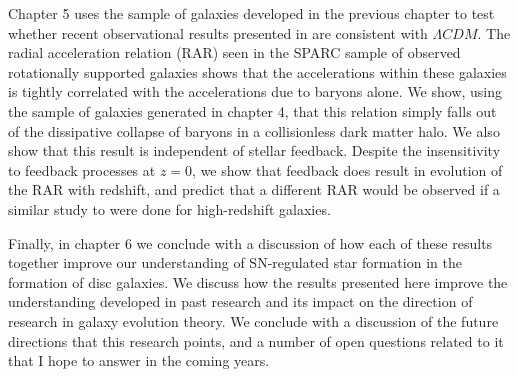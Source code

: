 Chapter 5 uses the sample of galaxies developed in the previous chapter to
test whether recent observational results presented in \citet{McGaugh2016}
are consistent with $\Lambda CDM$.  The radial acceleration relation (RAR) seen in
the SPARC sample \citep{Lelli2016} of observed rotationally supported galaxies
shows that the accelerations within these galaxies is tightly correlated 
with the accelerations due to baryons alone.  We show, using the sample of
galaxies generated in chapter 4, that this relation simply falls out of the
dissipative collapse of baryons in a collisionless dark matter halo.  We also
show that this result is independent of stellar feedback.  Despite the insensitivity
to feedback processes at $z=0$, we show that feedback does result in evolution
of the RAR with redshift, and predict that a different RAR would be observed if
a similar study to \citet{Lelli2016} were done for high-redshift galaxies.

Finally, in chapter 6 we conclude with a discussion of how each of these results
together improve our understanding of SN-regulated star formation in the
formation of disc galaxies.  We discuss how the results presented here improve
the understanding developed in past research and its impact on the direction of
research in galaxy evolution theory.  We conclude with a discussion of the
future directions that this research points, and a number of open questions
related to it that I hope to answer in the coming years.




